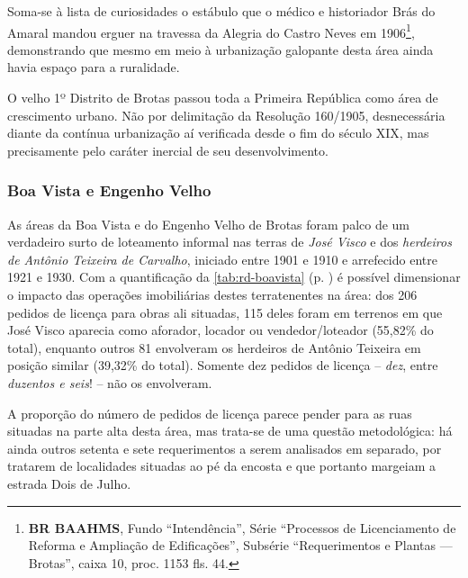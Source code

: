 Soma-se à lista de curiosidades o estábulo que o médico e historiador Brás do Amaral mandou erguer na travessa da Alegria do Castro Neves em 1906\footnote{\textbf{BR BAAHMS}, Fundo ``Intendência'', Série ``Processos de Licenciamento de Reforma e Ampliação de Edificações'', Subsérie ``Requerimentos e Plantas --- Brotas'', caixa 10, proc. 1153 fls. 44.}, demonstrando que mesmo em meio à urbanização galopante desta área ainda havia espaço para a ruralidade.


O velho 1º Distrito de Brotas passou toda a Primeira República como área de crescimento urbano. Não por delimitação da Resolução 160/1905, desnecessária diante da contínua urbanização aí verificada desde o fim do século XIX, mas precisamente pelo caráter inercial de seu desenvolvimento. 

\subsubsection{Boa Vista e Engenho Velho}


As áreas da Boa Vista e do Engenho Velho de Brotas foram palco de um verdadeiro surto de loteamento informal nas terras de \textit{José Visco} e dos \textit{herdeiros de Antônio Teixeira de Carvalho}, iniciado entre 1901 e 1910 e arrefecido entre 1921 e 1930. Com a quantificação da \autoref{tab:rd-boavista} (p. \pageref{tab:rd-boavista}) é possível dimensionar o impacto das operações imobiliárias destes terratenentes na área: dos 206 pedidos de licença para obras ali situadas, 115 deles foram em terrenos em que José Visco aparecia como aforador, locador ou vendedor/loteador (55,82\% do total), enquanto outros 81 envolveram os herdeiros de Antônio Teixeira em posição similar (39,32\% do total). Somente dez pedidos de licença – \textit{dez}, entre \textit{duzentos e seis}! – não os envolveram.





A proporção do número de pedidos de licença parece pender para as ruas situadas na parte alta desta área, mas trata-se de uma questão metodológica: há ainda outros setenta e sete requerimentos a serem analisados em separado, por tratarem de localidades situadas ao pé da encosta e que portanto margeiam a estrada Dois de Julho.

